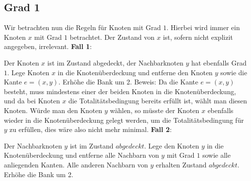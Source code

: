 \documentclass[12pt,onecolumn, notitlepage]{scrartcl}
\begin{document}
\subsection{Grad 1}
Wir betrachten nun die Regeln für Knoten mit Grad $1$. Hierbei wird immer ein Knoten $x$ mit Grad $1$ betrachtet. Der Zustand von $x$ ist, sofern nicht explizit angegeben, irrelevant.\newline \newline
\textbf{Fall 1}:\newline
\begin{center}
\end{center}
Der Knoten $x$ ist im Zustand abgedeckt, der Nachbarknoten $y$ hat ebenfalls Grad $1$. Lege Knoten $x$ in die Knotenüberdeckung und entferne den Knoten $y$ sowie die Kante $e = (x,y)$. Erhöhe die Bank um 2. \newline
Beweis: Da die Kante $e = (x,y)$ besteht, muss mindestens einer der beiden Knoten in die Knotenüberdeckung, und da bei Knoten $x$ die Totalitätsbedingung bereits erfüllt ist, wählt man diesen Knoten. Würde man den Knoten $y$ wählen, so müsste der Knoten $x$ ebenfalls wieder in die Knotenüberdeckung gelegt werden, um die Totalitätsbedingung für $y$ zu erfüllen, dies wäre also nicht mehr minimal. \newline \newline
\textbf{Fall 2}:\newline
\begin{center}
\end{center}
Der Nachbarknoten $y$ ist im Zustand $abgedeckt$.  Lege den Knoten $y$ in die Knotenüberdeckung und entferne alle Nachbarn von $y$ mit Grad $1$ sowie alle anliegenden Kanten. Alle anderen Nachbarn von $y$ erhalten Zustand $abgedeckt$.  Erhöhe die Bank um 2. \newline
\end{document}

